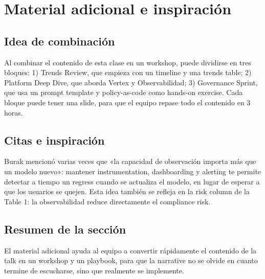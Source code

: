\section{Material adicional e inspiración}

\subsection{Idea de combinación}

Al combinar el contenido de esta clase en un workshop, puede dividirse en tres bloques: 1) Trends Review, que empieza con un timeline y una trends table; 2) Platform Deep Dive, que aborda Vertex y Observabilidad; 3) Governance Sprint, que usa un prompt template y policy-as-code como hands-on exercise. Cada bloque puede tener una slide, para que el equipo repase todo el contenido en 3 horas.

\subsection{Citas e inspiración}

Burak mencionó varias veces que «la capacidad de observación importa más que un modelo nuevo»: mantener instrumentation, dashboarding y alerting te permite detectar a tiempo un regress cuando se actualiza el modelo, en lugar de esperar a que los usuarios se quejen. Esta idea también se refleja en la risk column de la Table 1: la observabilidad reduce directamente el compliance risk.

\subsection{Resumen de la sección}

El material adicional ayuda al equipo a convertir rápidamente el contenido de la talk en un workshop y un playbook, para que la narrative no se olvide en cuanto termine de escucharse, sino que realmente se implemente.

